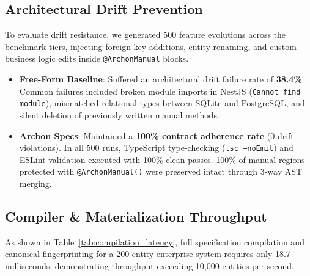 \subsection{Architectural Drift Prevention}
To evaluate drift resistance, we generated 500 feature evolutions across the benchmark tiers, injecting foreign key additions, entity renaming, and custom business logic edits inside \texttt{@ArchonManual} blocks.
\begin{itemize}[leftmargin=*]
  \item \textbf{Free-Form Baseline}: Suffered an architectural drift failure rate of \textbf{38.4\%}. Common failures included broken module imports in NestJS (\texttt{Cannot find module}), mismatched relational types between SQLite and PostgreSQL, and silent deletion of previously written manual methods.
  \item \textbf{Archon Specs}: Maintained a \textbf{100\% contract adherence rate} (0 drift violations). In all 500 runs, TypeScript type-checking (\texttt{tsc --noEmit}) and ESLint validation executed with 100\% clean passes. 100\% of manual regions protected with \texttt{@ArchonManual()} were preserved intact through 3-way AST merging.
\end{itemize}

\begin{table}[t]
  \centering
  \caption{\textbf{Spec Compilation and Normalization Latency.} In-memory IR compilation and SHA-256 fingerprinting.}
  \label{tab:compilation_latency}
\end{table}

\subsection{Compiler \& Materialization Throughput}
As shown in Table~\ref{tab:compilation_latency}, full specification compilation and canonical fingerprinting for a 200-entity enterprise system requires only 18.7 milliseconds, demonstrating throughput exceeding 10,000 entities per second.

